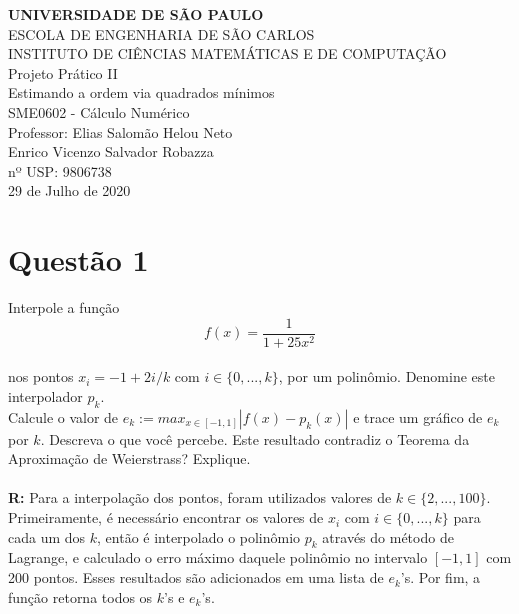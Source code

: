 \documentclass[12pt]{article}
\begin{document}
\setlength{\droptitle}{45mm}    
\begin{titlepage}
\begin{center}
\uppercase{
\textbf{Universidade de São Paulo}\\
\textsc{Escola de Engenharia de São Carlos}\\
\textsc{Instituto de Ciências Matemáticas e de Computação}
}
\hspace{5mm}\\[6cm]
\Huge{Projeto Prático II \\ Estimando a ordem via quadrados mínimos}\\[1cm]
\Large{SME0602 - Cálculo Numérico \\ Professor: Elias Salomão Helou Neto}\\[5cm]

\large{ 
\hspace*{\fill} Enrico Vicenzo Salvador Robazza\\ 
\hspace*{\fill} nº USP: 9806738\\[3cm]
29 de Julho de 2020
}
\end{center}
\end{titlepage}


\section*{Questão 1}
Interpole a função\\[5pt]
$$
f(x) = \frac{1}{1+25x^2}
$$\\[10pt]
nos pontos $x_i = -1+2i/k$ com $i \in \{0,...,k\}$, por um polinômio. Denomine este interpolador $p_k$. \\
Calcule o valor de $e_k := max_{x \in [-1,1]}|f(x)-p_k(x)|$ e trace um gráfico de $e_k$ por $k$. Descreva o que você percebe. Este resultado contradiz o Teorema da Aproximação de Weierstrass? Explique. \\
\\
{\bfseries R:} Para a interpolação dos pontos, foram utilizados valores de $k \in \{2,...,100 \}$.
Primeiramente, é necessário encontrar os valores de $x_i$ com $i \in \{0,...,k \}$ para cada um dos $k$, então é interpolado o polinômio $p_k$ através do método de Lagrange, e calculado o erro máximo daquele polinômio no intervalo $[-1,1]$ com 200 pontos. Esses resultados são adicionados em uma lista de $e_k$'s. Por fim, a função retorna todos os $k$'s e $e_k$'s.\\
\end{document}
